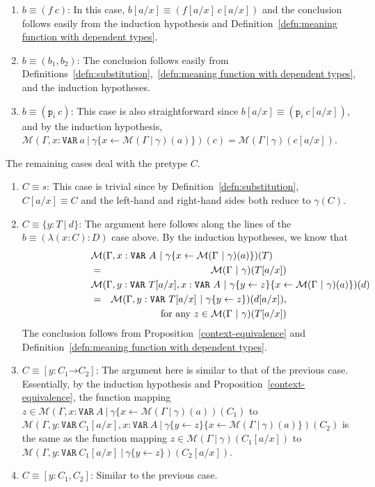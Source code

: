 \documentclass [12pt,twoside]{cslreport}
\newcommand{\thmbox}
   {{\ \hfill\hbox{%
      \vrule width1.0ex height1.0ex
   }\parfillskip 0pt }}
\newenvironment{proof}{{\bf Proof. }}{\thmbox}
\newcommand{\aro}{\mathord\rightarrow} %
\newcommand{\funtype}[2]{[#1 \aro #2]}
\newcommand{\tupletype}[1]{[#1]}
\newcommand{\Mgamma}[1]{{\mathcal M}(\Gamma\vbar\gamma)(#1)}
\newcommand{\proj}[1]{\mathtt{p}_{#1}}
\newcommand{\ttvar}{\mathtt{VAR}}
\newcommand{\vbar}{\ |\ }
\begin{document}
\begin{proof}
\begin{enumerate}
\item $b\equiv (f\ c)$:  In this case, $b[a/x]\equiv (f[a/x]~c[a/x])$
and the conclusion follows easily from the induction hypothesis
and Definition~\ref{defn:meaning function with dependent types}\@.

\item $b\equiv (b_1, b_2)$: 
The conclusion follows easily from 
Definitions~\ref{defn:substitution},~\ref{defn:meaning function with
dependent types}, and the induction hypotheses.


\item $b\equiv (\proj{i}~c)$: This case is also straightforward since
$b[a/x] \equiv (\proj{i}~c[a/x])$,  
and by the induction hypothesis,
$\mathcal{M}(\Gamma, x: \ttvar~a \vbar \gamma\{x \gets \Mgamma{a}\})(c) =
\Mgamma{c[a/x]}$.  
%
\end{enumerate}

The remaining cases deal with the pretype $C$\@.
\begin{enumerate}
\item $C\equiv s$:  This case is trivial since by
Definition~\ref{defn:substitution}, $C[a/x]\equiv C$ and
the left-hand and right-hand sides both reduce to $\gamma(C)$\@.

\item $C\equiv \{y : T \vbar d\}$: The argument here follows along the
lines of the $b\equiv (\lambda (x : C): D)$ case above.
By the induction hypotheses, we know that
\begin{eqnarray*}
\lefteqn{\mathcal{M}(\Gamma, x : \ttvar~A\vbar \gamma\{x\gets
\Mgamma{a}\})(T)}\\
& = & \Mgamma{T[a/x]}\\
\lefteqn{\mathcal{M}(\Gamma, y : \ttvar~T[a/x], x : \ttvar~A\vbar \gamma\{y\gets
z\}\{x\gets \Mgamma{a}\})(d)}\\
& = & \mathcal{M}(\Gamma, y : \ttvar~T[a/x]\vbar \gamma\{y\gets z\})(d[a/x]),\\&&
\mbox{ for any } z\in \Mgamma{T[a/x]}
\end{eqnarray*}
The conclusion follows from Proposition~\ref{context-equivalence}
and Definition~\ref{defn:meaning function with dependent types}.

\item $C\equiv \funtype{y:C_1}{C_2}$: The argument here is similar
to that of the previous case.  Essentially, by the induction hypothesis
and Proposition~\ref{context-equivalence}, the function mapping
$z\in \mathcal{M}(\Gamma, x : \ttvar~A\vbar \gamma\{x\gets \Mgamma{a})(C_1)$
to $\mathcal{M}(\Gamma, y:\ttvar~C_1[a/x], x : \ttvar~A\vbar \gamma\{y\gets
z\}\{x\gets \Mgamma{a}\})(C_2)$ is the same as the function mapping
$z\in \Mgamma{C_1[a/x]}$ to $\mathcal{M}(\Gamma, y: \ttvar~C_1[a/x]\vbar
\gamma\{y\gets z\})(C_2[a/x])$\@.  

\item $C\equiv \tupletype{y:C_1, C_2}$:   Similar to the previous case.
\end{enumerate}
\end{proof}
\end{document}
